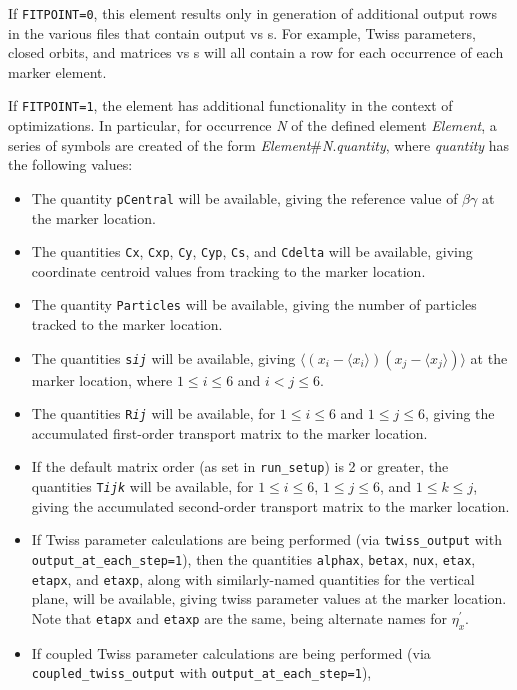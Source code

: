 If {\tt FITPOINT=0}, this element results only in generation of additional output rows in the various 
files that contain output vs s.  For example, Twiss parameters, closed orbits, and matrices vs s will
all contain a row for each occurrence of  each marker element.

If {\tt FITPOINT=1}, the element has additional functionality in the context of optimizations.  In particular,
for occurrence {\em N} of the defined element {\em Element}, a series of symbols are created of the
form {\em Element}\#{\em N}.{\em quantity}, where {\em quantity} has the following values:
\begin{itemize}
\item The quantity {\tt pCentral} will be available, giving the reference value of $\beta\gamma$ at the marker location.
\item The quantities {\tt Cx}, {\tt Cxp}, {\tt Cy}, {\tt Cyp}, {\tt Cs}, and {\tt Cdelta} will be available,
 giving coordinate centroid values from tracking to the marker location.
\item The quantity {\tt Particles} will be available, giving the number of particles tracked to the marker location.
\item The quantities {\tt s{\em i}{\em j}} will be available, giving $\langle ( x_i -\langle x_i\rangle)( x_j - \langle x_j \rangle)\rangle$
 at the marker location, where $1\leq i\leq 6$ and $i<j\leq 6$.
\item The quantities {\tt R{\em i}{\em j}} will be available, for $1\leq i \leq 6$ and $1\leq j \leq 6$,
  giving the accumulated first-order transport matrix to the marker location.
\item If the default matrix order (as set in {\tt run\_setup}) is 2 or greater, the quantities {\tt T{\em i}{\em j}{\em k}} 
  will be available, for $1\leq i \leq 6$, $1\leq j \leq 6$, and $1\leq k \leq j$,
  giving the accumulated second-order transport matrix to the marker location.
\item If Twiss parameter calculations are being performed (via {\tt twiss\_output} with {\tt output\_at\_each\_step=1}), then the quantities
  {\tt alphax}, {\tt betax}, {\tt nux}, {\tt etax}, {\tt etapx}, and {\tt etaxp}, along with similarly-named
  quantities for the vertical plane, will be available, giving twiss parameter values at the marker location.
  Note that {\tt etapx} and {\tt etaxp} are the same, being alternate names for $\eta_x^\prime$.
\item If coupled Twiss parameter calculations are being performed (via {\tt coupled\_twiss\_output} with {\tt output\_at\_each\_step=1}),

\end{itemize}
